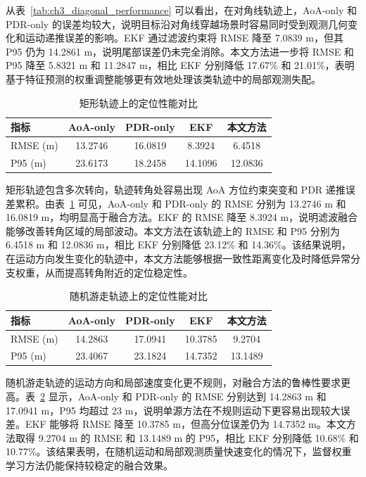 从表~\ref{tab:ch3_diagonal_performance} 可以看出，在对角线轨迹上，AoA-only 和 PDR-only 的误差均较大，说明目标沿对角线穿越场景时容易同时受到观测几何变化和运动递推误差的影响。EKF 通过滤波约束将 RMSE 降至 7.0839 m，但其 P95 仍为 14.2861 m，说明尾部误差仍未完全消除。本文方法进一步将 RMSE 和 P95 降至 5.8321 m 和 11.2847 m，相比 EKF 分别降低 17.67\% 和 21.01\%，表明基于特征预测的权重调整能够更有效地处理该类轨迹中的局部观测失配。

\begin{table}[htbp]
    \centering
    \caption{矩形轨迹上的定位性能对比}
    \label{tab:ch3_rectangle_performance}
    \begin{tabular}{lcccc}
        \toprule
        \textbf{指标} & \textbf{AoA-only} & \textbf{PDR-only} & \textbf{EKF} & \textbf{本文方法} \\
        \midrule
        RMSE (m) & 13.2746 & 16.0819 & 8.3924 & 6.4518 \\
        P95 (m) & 23.6173 & 18.2458 & 14.1096 & 12.0836 \\
        \bottomrule
    \end{tabular}
\end{table}

矩形轨迹包含多次转向，轨迹转角处容易出现 AoA 方位约束突变和 PDR 递推误差累积。由表~\ref{tab:ch3_rectangle_performance} 可见，AoA-only 和 PDR-only 的 RMSE 分别为 13.2746 m 和 16.0819 m，均明显高于融合方法。EKF 的 RMSE 降至 8.3924 m，说明滤波融合能够改善转角区域的局部波动。本文方法在该轨迹上的 RMSE 和 P95 分别为 6.4518 m 和 12.0836 m，相比 EKF 分别降低 23.12\% 和 14.36\%。该结果说明，在运动方向发生变化的轨迹中，本文方法能够根据一致性距离变化及时降低异常分支权重，从而提高转角附近的定位稳定性。

\begin{table}[htbp]
    \centering
    \caption{随机游走轨迹上的定位性能对比}
    \label{tab:ch3_random_walk_performance}
    \begin{tabular}{lcccc}
        \toprule
        \textbf{指标} & \textbf{AoA-only} & \textbf{PDR-only} & \textbf{EKF} & \textbf{本文方法} \\
        \midrule
        RMSE (m) & 14.2863 & 17.0941 & 10.3785 & 9.2704 \\
        P95 (m) & 23.4067 & 23.1824 & 14.7352 & 13.1489 \\
        \bottomrule
    \end{tabular}
\end{table}

随机游走轨迹的运动方向和局部速度变化更不规则，对融合方法的鲁棒性要求更高。表~\ref{tab:ch3_random_walk_performance} 显示，AoA-only 和 PDR-only 的 RMSE 分别达到 14.2863 m 和 17.0941 m，P95 均超过 23 m，说明单源方法在不规则运动下更容易出现较大误差。EKF 能够将 RMSE 降至 10.3785 m，但高分位误差仍为 14.7352 m。本文方法取得 9.2704 m 的 RMSE 和 13.1489 m 的 P95，相比 EKF 分别降低 10.68\% 和 10.77\%。该结果表明，在随机运动和局部观测质量快速变化的情况下，监督权重学习方法仍能保持较稳定的融合效果。


